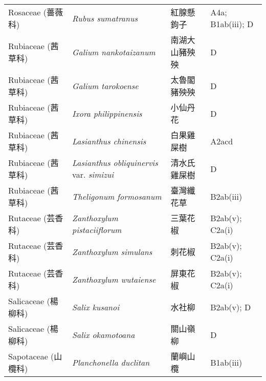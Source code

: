 \begin{longtable}{p{3cm}p{5cm}p{3cm}p{4cm}}
    Rosaceae (薔薇科) & \textit{Rubus sumatranus}  & 紅腺懸鉤子 & A4a; B1ab(iii); D \index{Rubus@\textit{Rubus}!sumatranus@\textit{sumatranus}}  \index{紅腺懸鉤子} \\
    Rubiaceae (茜草科) & \textit{Galium nankotaizanum}  & 南湖大山豬殃殃 & D \index{Galium@\textit{Galium}!nankotaizanum@\textit{nankotaizanum}}  \index{南湖大山豬殃殃} \\
    Rubiaceae (茜草科) & \textit{Galium tarokoense}  & 太魯閣豬殃殃 & D \index{Galium@\textit{Galium}!tarokoense@\textit{tarokoense}}  \index{太魯閣豬殃殃} \\
    Rubiaceae (茜草科) & \textit{Ixora philippinensis}  & 小仙丹花 & D \index{Ixora@\textit{Ixora}!philippinensis@\textit{philippinensis}}  \index{小仙丹花} \\
    Rubiaceae (茜草科) & \textit{Lasianthus chinensis}  & 白果雞屎樹 & A2acd \index{Lasianthus@\textit{Lasianthus}!chinensis@\textit{chinensis}}  \index{白果雞屎樹} \\
    Rubiaceae (茜草科) & \textit{Lasianthus obliquinervis} var. \textit{simizui}  & 清水氏雞屎樹 & D \index{Lasianthus@\textit{Lasianthus}!obliquinervis@\textit{obliquinervis}!var. simizui@var. \textit{simizui}}  \index{清水氏雞屎樹} \\
    Rubiaceae (茜草科) & \textit{Theligonum formosanum}  & 臺灣纖花草 & B2ab(iii) \index{Theligonum@\textit{Theligonum}!formosanum@\textit{formosanum}}  \index{臺灣纖花草} \\
    Rutaceae (芸香科) & \textit{Zanthoxylum pistaciiflorum}  & 三葉花椒 & B2ab(v); C2a(i) \index{Zanthoxylum@\textit{Zanthoxylum}!pistaciiflorum@\textit{pistaciiflorum}}  \index{三葉花椒} \\
    Rutaceae (芸香科) & \textit{Zanthoxylum simulans}  & 刺花椒 & B2ab(v); C2a(i) \index{Zanthoxylum@\textit{Zanthoxylum}!simulans@\textit{simulans}}  \index{刺花椒} \\
    Rutaceae (芸香科) & \textit{Zanthoxylum wutaiense}  & 屏東花椒 & B2ab(v); C2a(i) \index{Zanthoxylum@\textit{Zanthoxylum}!wutaiense@\textit{wutaiense}}  \index{屏東花椒} \\
    Salicaceae (楊柳科) & \textit{Salix kusanoi}  & 水社柳 & B2ab(v); D \index{Salix@\textit{Salix}!kusanoi@\textit{kusanoi}}  \index{水社柳} \\
    Salicaceae (楊柳科) & \textit{Salix okamotoana}  & 關山嶺柳 & D \index{Salix@\textit{Salix}!okamotoana@\textit{okamotoana}}  \index{關山嶺柳} \\
    Sapotaceae (山欖科) & \textit{Planchonella duclitan}  & 蘭嶼山欖 & B1ab(iii) \index{Planchonella@\textit{Planchonella}!duclitan@\textit{duclitan}}  \index{蘭嶼山欖} \\

\end{longtable}
